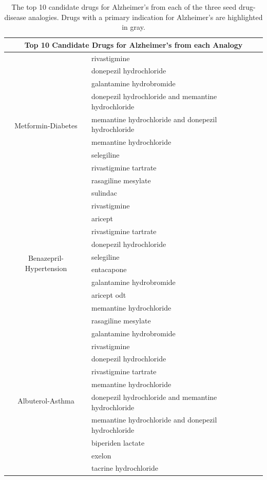 \documentclass{article}
\newcommand{\lgc}[1]{\cellcolor[gray]{0.85}#1}
\begin{document}
\begin{table}[t!]
\footnotesize
\centering
\caption{The top 10 candidate drugs for Alzheimer's from each of the three seed drug-disease analogies. Drugs with a primary indication for Alzheimer's are highlighted in gray.}
\label{tab:drugs_val_alzh}
\begin{tabular}{c l}
\hline
\multicolumn{2}{c}{Top 10 Candidate Drugs for Alzheimer's from each Analogy} \\
\hline
\multirow{10}{*}{Metformin-Diabetes} & \lgc{rivastigmine} \\
& \lgc{donepezil hydrochloride} \\
& \lgc{galantamine hydrobromide} \\
& \lgc{donepezil hydrochloride and memantine hydrochloride} \\
& \lgc{memantine hydrochloride and donepezil hydrochloride} \\
& \lgc{memantine hydrochloride} \\
& selegiline \\
& \lgc{rivastigmine tartrate} \\
& rasagiline mesylate \\
& sulindac \\
\hline
\multirow{10}{*}{Benazepril-Hypertension} & \lgc{rivastigmine} \\
& \lgc{aricept} \\
& \lgc{rivastigmine tartrate} \\
& \lgc{donepezil hydrochloride} \\
& selegiline \\
& entacapone \\
& \lgc{galantamine hydrobromide} \\
& \lgc{aricept odt} \\
& \lgc{memantine hydrochloride} \\
& rasagiline mesylate \\
\hline
\multirow{10}{*}{Albuterol-Asthma} & \lgc{galantamine hydrobromide} \\
& \lgc{rivastigmine} \\
& \lgc{donepezil hydrochloride} \\
& \lgc{rivastigmine tartrate} \\
& \lgc{memantine hydrochloride} \\
& \lgc{donepezil hydrochloride and memantine hydrochloride} \\
& \lgc{memantine hydrochloride and donepezil hydrochloride} \\
& biperiden lactate \\
& \lgc{exelon} \\
& \lgc{tacrine hydrochloride} \\
\hline
\end{tabular}
\end{table}
\end{document}
